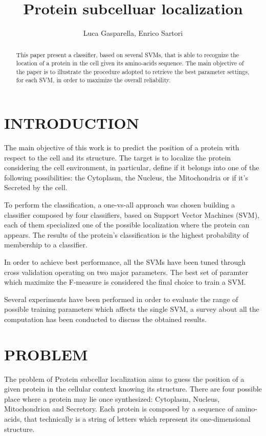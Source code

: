\documentclass{acm_proc_article-sp-sigmod07}
\begin{document}
\title{Protein subcelluar localization}
\author{Luca Gasparella, Enrico Sartori}

\maketitle

\begin{abstract}
This paper present a classifier, based on several SVMs, that is able to 
recognize the location of a protein in the cell given its amino-acids sequence.
The main objective of the paper is to illustrate the procedure adopted to 
retrieve the best parameter settings, for each SVM, in order to maximize
the overall reliability.
\end{abstract}

\section{INTRODUCTION}
The main objective of this work is to predict the position of a protein with 
respect to the cell and its structure. The target is to localize the protein 
considering the cell environment, in particular, define if it belongs into 
one of the following possibilities: the Cytoplasm, the Nucleus, 
the Mitochondria or if it's Secreted by the cell.

To perform the classification, a one-vs-all approach was chosen building a
classifier composed by four classifiers, based on Support Vector Machines (SVM),
each of them specialized one of the possible localization where the protein can
appears. The results of the protein's classification is the highest probability 
of membership to a classifier.

In order to achieve best performance, all the SVMs have been tuned through 
cross validation operating on two major parameters. The best set of paramter
which maximize the F-measure is considered the final choice to train a
SVM.

Several experiments have been performed in order to evaluate the range of 
possible training parameters which affects the single SVM, a survey about
all the computation has been conducted to discuss the obtained results.


\section{PROBLEM}
The problem of Protein subcellar localization aims to guess the position of a 
given protein in the cellular context knowing its structure. There are four 
possible place where a protein may lie once synthesized: Cytoplasm, Nucleus, 
Mitochondrion and Secretory.  
Each protein is composed by a sequence of amino-acids, that technically is a 
string of letters which represent its one-dimensional structure. 
\end{document}
